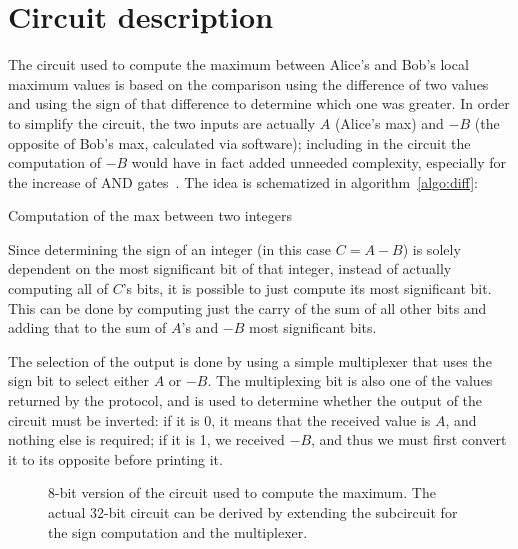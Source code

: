 \section{Circuit description}\label{circuit}

The circuit used to compute the maximum between Alice's and Bob's local maximum values is based on the comparison using the difference of two values and using the sign of that difference to determine which one was greater. In order to simplify the circuit, the two inputs are actually $A$ (Alice's max) and $-B$ (the opposite of Bob's max, calculated via software); including in the circuit the computation of $-B$ would have in fact added unneeded complexity, especially for the increase of AND gates~\cite{efficiency}. The idea is schematized in algorithm~\ref{algo:diff}:

\begin{algorithm}
    \DontPrintSemicolon
    \caption{Computation of the max between two integers}\label{algo:diff}
\end{algorithm}

Since determining the sign of an integer (in this case $C=A-B$) is solely dependent on the most significant bit of that integer, instead of actually computing all of $C$'s bits, it is possible to just compute its most significant bit. This can be done by computing just the carry of the sum of all other bits and adding that to the sum of $A$'s and $-B$ most significant bits.

The selection of the output is done by using a simple multiplexer that uses the sign bit to select either $A$ or $-B$. The multiplexing bit is also one of the values returned by the protocol, and is used to determine whether the output of the circuit must be inverted: if it is 0, it means that the received value is $A$, and nothing else is required; if it is 1, we received $-B$, and thus we must first convert it to its opposite before printing it.


\begin{figure}[ht]
    \noindent{}
    \caption{8-bit version of the circuit used to compute the maximum. The actual 32-bit circuit can be derived by extending the subcircuit for the sign computation and the multiplexer.}
    \label{fig:circuit}
\end{figure}

